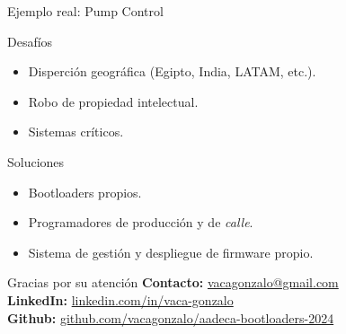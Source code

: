 \documentclass{beamer}
\begin{document}
\begin{frame}{Ejemplo real: Pump Control}
    \begin{block}{Desafíos}
        \begin{itemize}
            \item Disperción geográfica (Egipto, India, LATAM, etc.).
            \item Robo de propiedad intelectual.
            \item Sistemas críticos.
        \end{itemize}
    \end{block}
    \begin{block}{Soluciones}
        \begin{itemize}
            \item Bootloaders propios.
            \item Programadores de producción y de \emph{calle}.
            \item Sistema de gestión y despliegue de firmware propio.
        \end{itemize}
    \end{block}
\end{frame}



\appendix
\begin{frame}
    \centering
    \Huge Gracias por su atención
    \vfill
    \normalsize
    \textbf{Contacto:} \href{mailto:vacagonzalo@gmail.com}{vacagonzalo@gmail.com} \\
    \textbf{LinkedIn:} \href{https://www.linkedin.com/in/vaca-gonzalo}{linkedin.com/in/vaca-gonzalo} \\
    \textbf{Github:} \href{https://github.com/vacagonzalo/aadeca-bootloaders-2024}{github.com/vacagonzalo/aadeca-bootloaders-2024}
\end{frame}
\end{document}
